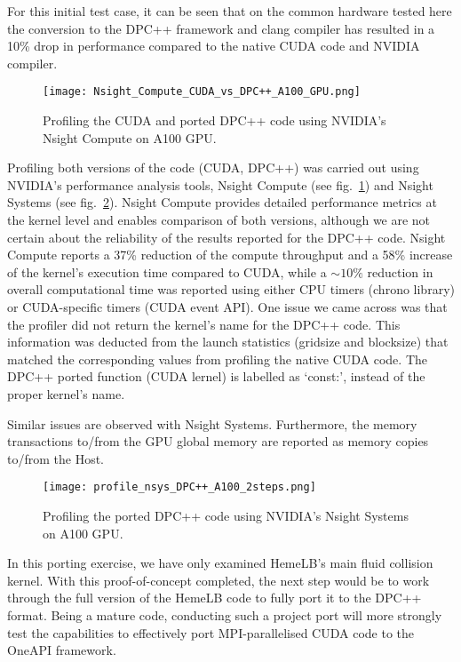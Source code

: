 For this initial test case, it can be seen that on the common hardware tested here the conversion to the DPC++ framework and clang compiler has resulted in a 10\% drop in performance compared to the native CUDA code and NVIDIA compiler.

\begin{figure}[htp]
	\centering
	\texttt{[image: Nsight\_Compute\_CUDA\_vs\_DPC++\_A100\_GPU.png]}
	\caption{Profiling the CUDA and ported DPC++ code using NVIDIA's Nsight Compute on A100 GPU.}
	\label{fig:ncu_CUDA_Vs_DPC++_A100GPU}
\end{figure}

Profiling both versions of the code (CUDA, DPC++) was carried out using NVIDIA's performance analysis tools, Nsight Compute (see fig.~\ref{fig:ncu_CUDA_Vs_DPC++_A100GPU}) and Nsight Systems (see fig.~\ref{fig:nsys_DPC++_A100GPU}).
Nsight Compute provides detailed performance metrics at the kernel level and enables comparison of both versions, although we are not certain about the reliability of the results reported for the DPC++ code.
Nsight Compute reports a 37\% reduction of the compute throughput and a 58\% increase of the kernel's execution time compared to CUDA, while a $\sim10\%$ reduction in overall computational time was reported using either CPU timers (chrono library) or CUDA-specific timers (CUDA event API).
One issue we came across was that the profiler did not return the kernel's name for the DPC++ code.
This information was deducted from the launch statistics (gridsize and blocksize) that matched the corresponding values from profiling the native CUDA code.
The DPC++ ported function (CUDA lernel) is labelled as `const:', instead of the proper kernel's name.


Similar issues are observed with Nsight Systems.
Furthermore, the memory transactions to/from the GPU global memory are reported as memory copies to/from the Host.


\begin{figure}[htp]
	\centering
	\texttt{[image: profile\_nsys\_DPC++\_A100\_2steps.png]}
	\caption{Profiling the ported DPC++ code using NVIDIA's Nsight Systems on A100 GPU.}
	\label{fig:nsys_DPC++_A100GPU}
\end{figure}

In this porting exercise, we have only examined HemeLB's main fluid collision kernel.
With this proof-of-concept completed, the next step would be to work through the full version of the HemeLB code to fully port it to the DPC++ format.
Being a mature code, conducting such a project port will more strongly test the capabilities to effectively port MPI-parallelised CUDA code to the OneAPI framework.

